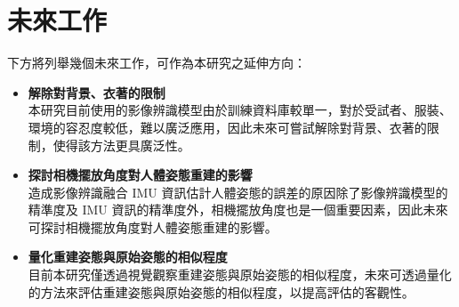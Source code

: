 \section{未來工作}
下方將列舉幾個未來工作，可作為本研究之延伸方向：

\begin{itemize}
    \item \textbf{解除對背景、衣著的限制}
    \\ 本研究目前使用的影像辨識模型由於訓練資料庫較單一，對於受試者、服裝、環境的容忍度較低，難以廣泛應用，因此未來可嘗試解除對背景、衣著的限制，使得該方法更具廣泛性。
    \item \textbf{探討相機擺放角度對人體姿態重建的影響}
    \\ 造成影像辨識融合 IMU 資訊估計人體姿態的誤差的原因除了影像辨識模型的精準度及 IMU 資訊的精準度外，相機擺放角度也是一個重要因素，因此未來可探討相機擺放角度對人體姿態重建的影響。
    \item \textbf{量化重建姿態與原始姿態的相似程度}
    \\ 目前本研究僅透過視覺觀察重建姿態與原始姿態的相似程度，未來可透過量化的方法來評估重建姿態與原始姿態的相似程度，以提高評估的客觀性。
\end{itemize}

\clearpage